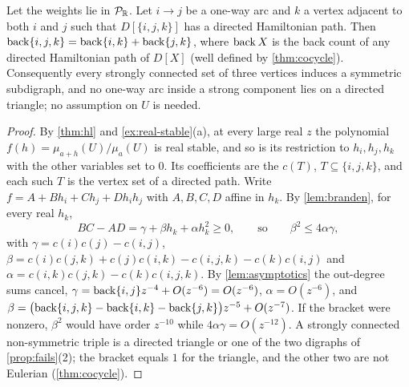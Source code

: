 \begin{corollary}\label{cor:triangles}
Let the weights lie in $\mathcal{P}_{\mathbb{R}}$. Let $i\to j$ be a one-way arc and $k$ a vertex adjacent to both $i$ and $j$ such that $D[\{i,j,k\}]$ has a directed Hamiltonian path. Then $\operatorname{back}\{i,j,k\}=\operatorname{back}\{i,k\}+\operatorname{back}\{j,k\}$, where $\operatorname{back} X$ is the back count of any directed Hamiltonian path of $D[X]$ \textup{(}well defined by \cref{thm:cocycle}\textup{)}. Consequently every strongly connected set of three vertices induces a symmetric subdigraph, and no one-way arc inside a strong component lies on a directed triangle; no assumption on $U$ is needed.
\end{corollary}
\begin{proof}
By \cref{thm:hl} and \cref{ex:real-stable}(a), at every large real $z$ the polynomial $f(h)=\mu_{a+h}(U)/\mu_a(U)$ is real stable, and so is its restriction to $h_i,h_j,h_k$ with the other variables set to $0$. Its coefficients are the $c(T)$, $T\subseteq\{i,j,k\}$, and each such $T$ is the vertex set of a directed path. Write $f=A+Bh_i+Ch_j+Dh_ih_j$ with $A,B,C,D$ affine in $h_k$. By \cref{lem:branden}, for every real $h_k$,
\[
BC-AD=\gamma+\beta h_k+\alpha h_k^{2}\ge0,\qquad\text{so}\qquad \beta^{2}\le4\alpha\gamma,
\]
with $\gamma=c(i)c(j)-c(i,j)$, $\beta=c(i)c(j,k)+c(j)c(i,k)-c(i,j,k)-c(k)c(i,j)$ and $\alpha=c(i,k)c(j,k)-c(k)c(i,j,k)$. By \cref{lem:asymptotics} the out-degree sums cancel, $\gamma=\operatorname{back}\{i,j\}z^{-4}+O(z^{-6})=O(z^{-6})$, $\alpha=O(z^{-6})$, and $\beta=\bigl(\operatorname{back}\{i,j,k\}-\operatorname{back}\{i,k\}-\operatorname{back}\{j,k\}\bigr)z^{-5}+O(z^{-7})$. If the bracket were nonzero, $\beta^2$ would have order $z^{-10}$ while $4\alpha\gamma=O(z^{-12})$. A strongly connected non-symmetric triple is a directed triangle or one of the two digraphs of \cref{prop:fails}(2); the bracket equals $1$ for the triangle, and the other two are not Eulerian (\cref{thm:cocycle}).
\end{proof}


